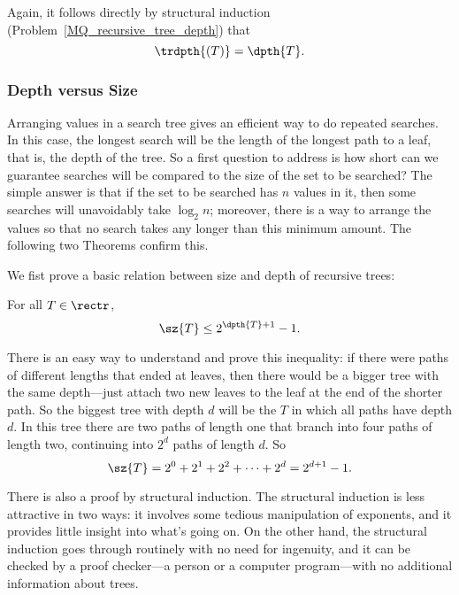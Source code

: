 \begin{definition}
Again, it follows directly by structural induction
(Problem~\ref{MQ_recursive_tree_depth}) that
\begin{equation}\label{recdepth=depth}
\trdpth{(T)} = \dpth{T}.
\end{equation}

\subsubsection{Depth versus Size}

Arranging values in a search tree gives an efficient way to do
repeated searches.  In this case, the longest search will be the
length of the longest path to a leaf, that is, the depth of the tree.
So a first question to address is how short can we guarantee searches
will be compared to the size of the set to be searched?  The simple
answer is that if the set to be searched has $n$ values in it, then
some searches will unavoidably take $\log_2 n$; moreover, there is a
way to arrange the values so that no search takes any longer than this
minimum amount.  The following two Theorems confirm this.

We fist prove a basic relation between size and depth of recursive
trees:
\begin{theorem}\label{szT2d1}
For all $T \in \rectr$,
\begin{equation}\label{sT2d+1}
\sz{T} \leq 2^{\dpth{T}+1} - 1.
\end{equation}
\end{theorem}

There is an easy way to understand and prove this inequality: if
there were paths of different lengths that ended at leaves, then there
would be a bigger tree with the same depth---just attach two new
leaves to the leaf at the end of the shorter path.  So the biggest
tree with depth $d$ will be the  $T$ in which all
paths have depth $d$.  In this tree there are two paths of length one
that branch into four paths of length two, continuing into $2^d$ paths
of length $d$.  So
\[
\sz{T} = 2^0 + 2^1 + 2^2 + \cdots + 2^d = 2^{d+1}-1.
\]

There is also a proof by structural induction.  The structural
induction is less attractive in two ways: it involves some tedious
manipulation of exponents, and it provides little insight into what's
going on.  On the other hand, the structural induction goes through
routinely with no need for ingenuity, and it can be checked by a proof
checker---a person or a computer program---with no additional
information about trees.


\end{definition}
